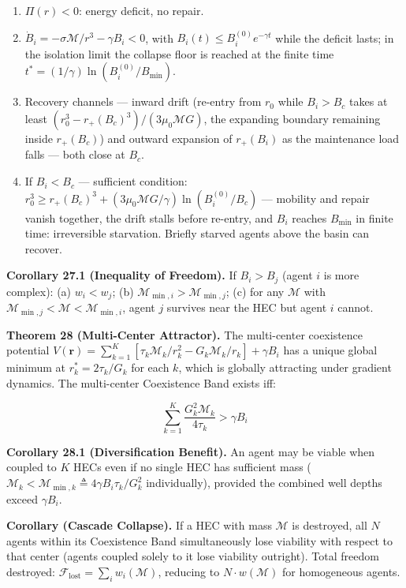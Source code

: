 \documentclass[11pt]{article}
\begin{document}
\begin{enumerate}
\def\labelenumi{(\alph{enumi})}
\item
  \(\Pi(r) < 0\): energy deficit, no repair.
\item
  \(\dot{B}_i = -\sigma\mathcal{M}/r^3 - \gamma B_i < 0\), with
  \(B_i(t) \leq B_i^{(0)}e^{-\gamma t}\) while the deficit lasts; in the
  isolation limit the collapse floor is reached at the finite time
  \(t^* = (1/\gamma)\ln(B_i^{(0)}/B_{\min})\).
\item
  Recovery channels --- inward drift (re-entry from \(r_0\) while
  \(B_i > B_c\) takes at least
  \((r_0^3 - r_+(B_c)^3)/(3\mu_0\mathcal{M}G)\), the expanding boundary
  remaining inside \(r_+(B_c)\)) and outward expansion of \(r_+(B_i)\)
  as the maintenance load falls --- both close at \(B_c\).
\item
  If \(B_i < B_c\) --- sufficient condition:
  \(r_0^3 \geq r_+(B_c)^3 + (3\mu_0\mathcal{M}G/\gamma)\ln(B_i^{(0)}/B_c)\)
  --- mobility and repair vanish together, the drift stalls before
  re-entry, and \(B_i\) reaches \(B_{\min}\) in finite time:
  irreversible starvation. Briefly starved agents above the basin can
  recover.
\end{enumerate}

\textbf{Corollary 27.1 (Inequality of Freedom).} If \(B_i > B_j\) (agent
\(i\) is more complex): (a) \(w_i < w_j\); (b)
\(\mathcal{M}_{\min,i} > \mathcal{M}_{\min,j}\); (c) for any
\(\mathcal{M}\) with
\(\mathcal{M}_{\min,j} < \mathcal{M} < \mathcal{M}_{\min,i}\), agent
\(j\) survives near the HEC but agent \(i\) cannot.

\textbf{Theorem 28 (Multi-Center Attractor).} The multi-center
coexistence potential
\(V(\mathbf{r}) = \sum_{k=1}^K [\tau_k\mathcal{M}_k/r_k^2 - G_k\mathcal{M}_k/r_k] + \gamma B_i\)
has a unique global minimum at \(r_k^* = 2\tau_k/G_k\) for each \(k\),
which is globally attracting under gradient dynamics. The multi-center
Coexistence Band exists iff:

\[\sum_{k=1}^{K} \frac{G_k^2 \mathcal{M}_k}{4\tau_k} > \gamma B_i\]

\textbf{Corollary 28.1 (Diversification Benefit).} An agent may be
viable when coupled to \(K\) HECs even if no single HEC has sufficient
mass
(\(\mathcal{M}_k < \mathcal{M}_{\min,k} \triangleq 4\gamma B_i \tau_k / G_k^2\)
individually), provided the combined well depths exceed \(\gamma B_i\).

\textbf{Corollary (Cascade Collapse).} If a HEC with mass
\(\mathcal{M}\) is destroyed, all \(N\) agents within its Coexistence
Band simultaneously lose viability with respect to that center (agents
coupled solely to it lose viability outright). Total freedom destroyed:
\(\mathcal{F}_{\text{lost}} = \sum_i w_i(\mathcal{M})\), reducing to
\(N \cdot w(\mathcal{M})\) for homogeneous agents.
\end{document}
